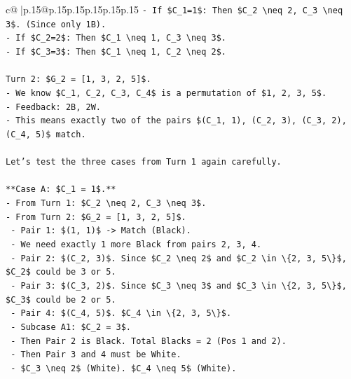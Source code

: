 \documentclass{article}
\begin{document}
{\begin{supertabular}{c@{$\;$}|p{.15\linewidth}@{}p{.15\linewidth}p{.15\linewidth}p{.15\linewidth}p{.15\linewidth}p{.15\linewidth}}
{{{\texttt{{-} If \$C\_1=1\$: Then \$C\_2 \textbackslash{}neq 2, C\_3 \textbackslash{}neq 3\$. (Since only 1B).} \\
\texttt{{-} If \$C\_2=2\$: Then \$C\_1 \textbackslash{}neq 1, C\_3 \textbackslash{}neq 3\$.} \\
\texttt{{-} If \$C\_3=3\$: Then \$C\_1 \textbackslash{}neq 1, C\_2 \textbackslash{}neq 2\$.} \\
\\ 
\texttt{Turn 2: \$G\_2 = {[}1, 3, 2, 5{]}\$.} \\
\texttt{{-} We know \$C\_1, C\_2, C\_3, C\_4\$ is a permutation of \$1, 2, 3, 5\$.} \\
\texttt{{-} Feedback: 2B, 2W.} \\
\texttt{{-} This means exactly two of the pairs \$(C\_1, 1), (C\_2, 3), (C\_3, 2), (C\_4, 5)\$ match.} \\
\\ 
\texttt{Let's test the three cases from Turn 1 again carefully.} \\
\\ 
\texttt{**Case A: \$C\_1 = 1\$.**} \\
\texttt{{-} From Turn 1: \$C\_2 \textbackslash{}neq 2, C\_3 \textbackslash{}neq 3\$.} \\
\texttt{{-} From Turn 2: \$G\_2 = {[}1, 3, 2, 5{]}\$.} \\
\texttt{  {-} Pair 1: \$(1, 1)\$ {-}> Match (Black).} \\
\texttt{  {-} We need exactly 1 more Black from pairs 2, 3, 4.} \\
\texttt{  {-} Pair 2: \$(C\_2, 3)\$. Since \$C\_2 \textbackslash{}neq 2\$ and \$C\_2 \textbackslash{}in \textbackslash{}\{2, 3, 5\textbackslash{}\}\$, \$C\_2\$ could be 3 or 5.} \\
\texttt{  {-} Pair 3: \$(C\_3, 2)\$. Since \$C\_3 \textbackslash{}neq 3\$ and \$C\_3 \textbackslash{}in \textbackslash{}\{2, 3, 5\textbackslash{}\}\$, \$C\_3\$ could be 2 or 5.} \\
\texttt{  {-} Pair 4: \$(C\_4, 5)\$. \$C\_4 \textbackslash{}in \textbackslash{}\{2, 3, 5\textbackslash{}\}\$.} \\
\texttt{  {-} Subcase A1: \$C\_2 = 3\$.} \\
\texttt{    {-} Then Pair 2 is Black. Total Blacks = 2 (Pos 1 and 2).} \\
\texttt{    {-} Then Pair 3 and 4 must be White.} \\
\texttt{    {-} \$C\_3 \textbackslash{}neq 2\$ (White). \$C\_4 \textbackslash{}neq 5\$ (White).} \\
}}}
\end{supertabular}}
\end{document}
